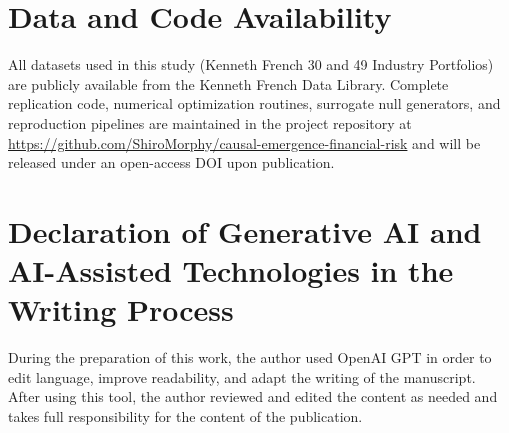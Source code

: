 \documentclass[12pt,authoryear]{elsarticle}
\begin{document}
\section*{Data and Code Availability}
All datasets used in this study (Kenneth French 30 and 49 Industry Portfolios) are publicly available from the Kenneth French Data Library. Complete replication code, numerical optimization routines, surrogate null generators, and reproduction pipelines are maintained in the project repository at \url{https://github.com/ShiroMorphy/causal-emergence-financial-risk} and will be released under an open-access DOI upon publication.

\section*{Declaration of Generative AI and AI-Assisted Technologies in the Writing Process}
During the preparation of this work, the author used OpenAI GPT in order to edit language, improve readability, and adapt the writing of the manuscript. After using this tool, the author reviewed and edited the content as needed and takes full responsibility for the content of the publication.
\end{document}
